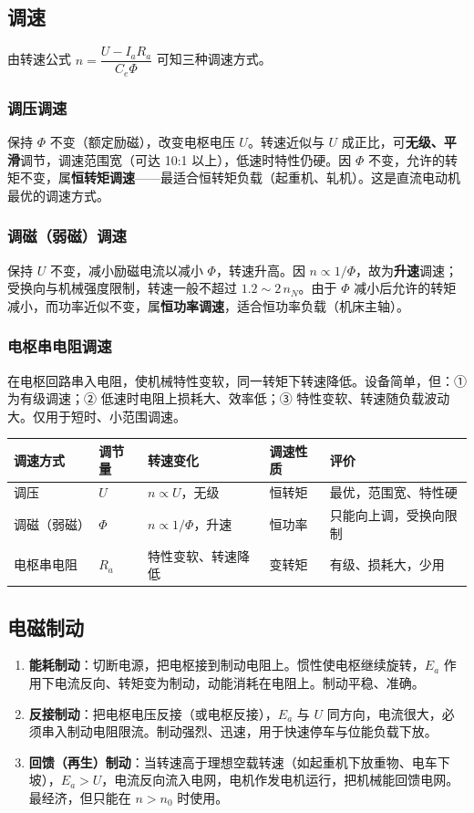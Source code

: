 \subsection{调速}
由转速公式 $n=\dfrac{U-I_aR_a}{C_e\Phi}$ 可知三种调速方式。

\subsubsection{调压调速}
保持 $\Phi$ 不变（额定励磁），改变电枢电压 $U$。转速近似与 $U$ 成正比，可\textbf{无级、平滑}调节，调速范围宽（可达 10:1 以上），低速时特性仍硬。因 $\Phi$ 不变，允许的转矩不变，属\textbf{恒转矩调速}——最适合恒转矩负载（起重机、轧机）。这是直流电动机最优的调速方式。

\subsubsection{调磁（弱磁）调速}
保持 $U$ 不变，减小励磁电流以减小 $\Phi$，转速升高。因 $n\propto1/\Phi$，故为\textbf{升速}调速；受换向与机械强度限制，转速一般不超过 $1.2\sim2\,n_N$。由于 $\Phi$ 减小后允许的转矩减小，而功率近似不变，属\textbf{恒功率调速}，适合恒功率负载（机床主轴）。

\subsubsection{电枢串电阻调速}
在电枢回路串入电阻，使机械特性变软，同一转矩下转速降低。设备简单，但：① 为有级调速；② 低速时电阻上损耗大、效率低；③ 特性变软、转速随负载波动大。仅用于短时、小范围调速。

\begin{center}
\begin{tabular}{@{}p{2.0cm}p{2.6cm}p{3.2cm}p{3.4cm}p{2.4cm}@{}}
\toprule
调速方式 & 调节量 & 转速变化 & 调速性质 & 评价 \\
\midrule
调压 & $U$ & $n\propto U$，无级 & 恒转矩 & 最优，范围宽、特性硬 \\
调磁（弱磁） & $\Phi$ & $n\propto1/\Phi$，升速 & 恒功率 & 只能向上调，受换向限制 \\
电枢串电阻 & $R_a$ & 特性变软、转速降低 & 变转矩 & 有级、损耗大，少用 \\
\bottomrule
\end{tabular}
\end{center}

\subsection{电磁制动}
\begin{enumerate}
  \item \textbf{能耗制动}：切断电源，把电枢接到制动电阻上。惯性使电枢继续旋转，$E_a$ 作用下电流反向、转矩变为制动，动能消耗在电阻上。制动平稳、准确。
  \item \textbf{反接制动}：把电枢电压反接（或电枢反接），$E_a$ 与 $U$ 同方向，电流很大，必须串入制动电阻限流。制动强烈、迅速，用于快速停车与位能负载下放。
  \item \textbf{回馈（再生）制动}：当转速高于理想空载转速（如起重机下放重物、电车下坡），$E_a>U$，电流反向流入电网，电机作发电机运行，把机械能回馈电网。最经济，但只能在 $n>n_0$ 时使用。
\end{enumerate}

